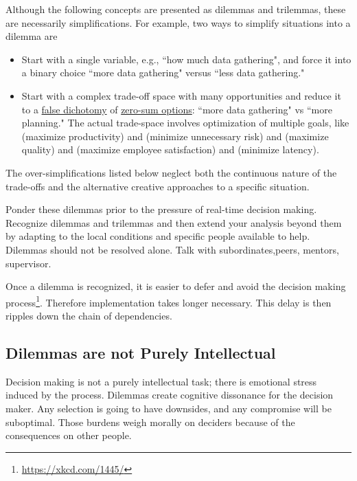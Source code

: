 Although the following concepts are presented as dilemmas and trilemmas, these are necessarily simplifications. For example, two ways to simplify situations into a dilemma are
\begin{itemize}
    \item Start with a single variable, e.g., ``how much data gathering", and force it into a binary choice ``more data gathering" versus ``less data gathering."
    
    \item Start with a complex trade-off space with many opportunities and reduce it to a \href{https://en.wikipedia.org/wiki/False_dilemma}{false dichotomy} of \href{https://en.wikipedia.org/wiki/Zero-sum_thinking}{zero-sum options}: ``more data gathering" vs ``more planning." The actual trade-space involves optimization of multiple goals, like (maximize productivity) and (minimize unnecessary risk) and (maximize quality) and (maximize employee satisfaction) and (minimize latency). 
\end{itemize}
The over-simplifications listed below neglect both the continuous nature of the trade-offs and the alternative creative approaches to a specific situation. 




Ponder these dilemmas prior to the pressure of real-time decision making.  Recognize dilemmas and trilemmas and then extend your analysis beyond them by adapting to the local conditions and specific people available to help.
Dilemmas should not be resolved alone. Talk with subordinates,peers, mentors, supervisor.


Once a dilemma is recognized, it is easier to defer and avoid the  decision making process\footnote{\href{https://xkcd.com/1445/}{https://xkcd.com/1445/}}. Therefore implementation takes longer necessary. 
This delay is then ripples down the chain of dependencies. 

\subsection*{Dilemmas are not Purely Intellectual}
Decision making is not a purely intellectual task; there is emotional stress induced by the process. Dilemmas create cognitive dissonance for the decision maker. Any selection is going to have downsides, and any compromise will be suboptimal. Those burdens weigh morally on deciders because of the consequences on other people.

